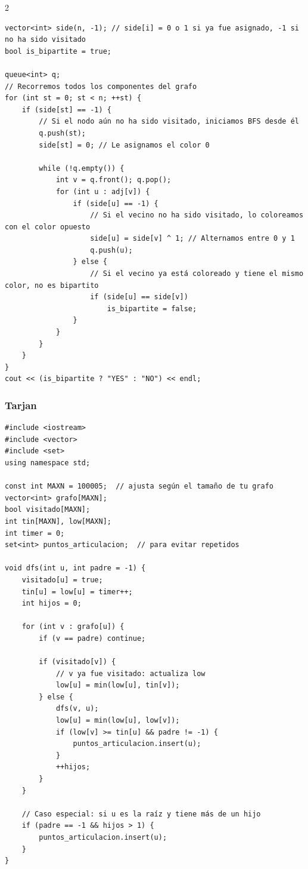 \documentclass[twoside]{article}
\begin{document}
\begin{multicols*}{2}
\begin{verbatim}
vector<int> side(n, -1); // side[i] = 0 o 1 si ya fue asignado, -1 si no ha sido visitado
bool is_bipartite = true; 

queue<int> q; 
// Recorremos todos los componentes del grafo
for (int st = 0; st < n; ++st) {
    if (side[st] == -1) {
        // Si el nodo aún no ha sido visitado, iniciamos BFS desde él
        q.push(st);
        side[st] = 0; // Le asignamos el color 0

        while (!q.empty()) {
            int v = q.front(); q.pop();
            for (int u : adj[v]) {
                if (side[u] == -1) {
                    // Si el vecino no ha sido visitado, lo coloreamos con el color opuesto
                    side[u] = side[v] ^ 1; // Alternamos entre 0 y 1
                    q.push(u);
                } else {
                    // Si el vecino ya está coloreado y tiene el mismo color, no es bipartito
                    if (side[u] == side[v])
                        is_bipartite = false;
                }
            }
        }
    }
}
cout << (is_bipartite ? "YES" : "NO") << endl; 

\end{verbatim}

	{
		\subsubsection*{Tarjan}
	}
	\begin{verbatim}
#include <iostream>
#include <vector>
#include <set>
using namespace std;

const int MAXN = 100005;  // ajusta según el tamaño de tu grafo
vector<int> grafo[MAXN];
bool visitado[MAXN];
int tin[MAXN], low[MAXN];
int timer = 0;
set<int> puntos_articulacion;  // para evitar repetidos

void dfs(int u, int padre = -1) {
    visitado[u] = true;
    tin[u] = low[u] = timer++;
    int hijos = 0;

    for (int v : grafo[u]) {
        if (v == padre) continue;

        if (visitado[v]) {
            // v ya fue visitado: actualiza low
            low[u] = min(low[u], tin[v]);
        } else {
            dfs(v, u);
            low[u] = min(low[u], low[v]);
            if (low[v] >= tin[u] && padre != -1) {
                puntos_articulacion.insert(u);
            }
            ++hijos;
        }
    }

    // Caso especial: si u es la raíz y tiene más de un hijo
    if (padre == -1 && hijos > 1) {
        puntos_articulacion.insert(u);
    }
}


\end{verbatim}
\end{multicols*}
\end{document}
